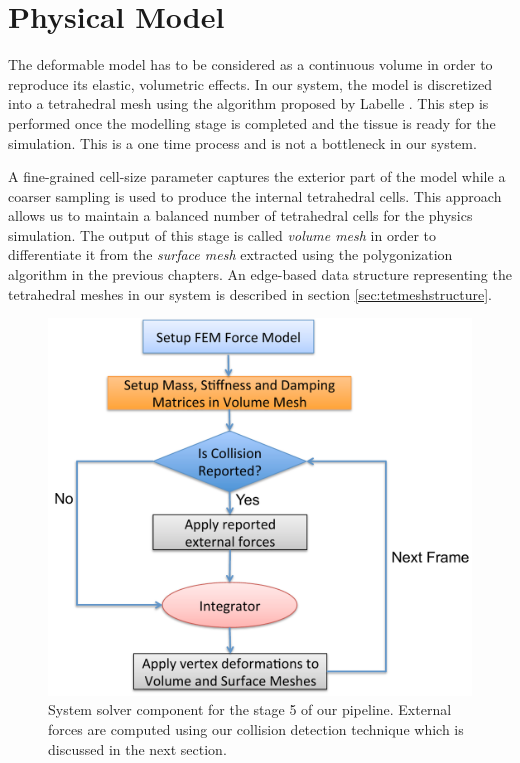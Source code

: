 \section{Physical Model}
\label{sec:physicalmodel}
The deformable model has to be considered as a continuous volume in order to reproduce its elastic, 
volumetric effects. In our system, the \blob model is discretized into a tetrahedral mesh using the 
algorithm proposed by Labelle \etal \cite{Labelle2007}. This step is performed once the modelling stage is
completed and the tissue is ready for the simulation. This is a one time process and is not a bottleneck 
in our system. 

A fine-grained cell-size parameter captures the exterior part of the model while a coarser sampling is 
used to produce the internal tetrahedral cells. This approach allows us to maintain a balanced number 
of tetrahedral cells for the physics simulation. The output of this stage is called \textit{volume mesh} in 
order to differentiate it from the \textit{surface mesh} extracted using the polygonization algorithm in 
the previous chapters. An edge-based data structure representing the tetrahedral meshes in our system 
is described in section \ref{sec:tetmeshstructure}.

\begin{figure}[H]
  \centering
  \includegraphics[width=0.8\linewidth]{figures/deformable/solver.pdf}
  \caption{\label{fig:solver}
  {System solver component for the stage 5 of our pipeline. External forces are computed using 
  our collision detection technique which is discussed in the next section. }
}
\end{figure}

